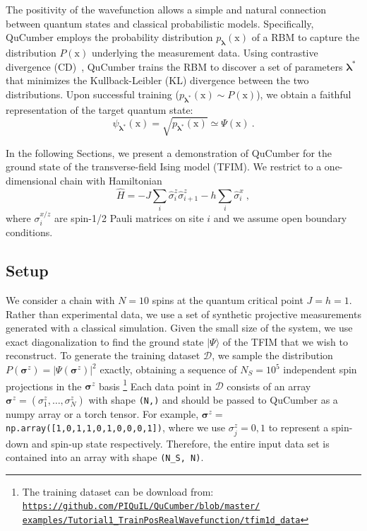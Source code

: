 \documentclass[submission, Phys, hidelinks]{SciPost}
\begin{document}
The positivity of the wavefunction allows a simple and natural connection between quantum states and classical probabilistic models. Specifically, QuCumber employs the probability distribution $p_{\bm{\lambda}}(\bm{\mathrm{x}})$ of a RBM to capture the distribution $P(\bm{\mathrm{x}})$ underlying the measurement data. Using contrastive divergence (CD)~\cite{hinton2002training}, QuCumber trains the RBM to discover a set of parameters $\bm{\lambda}^*$ that minimizes the Kullback-Leibler (KL) divergence between the two distributions. Upon successful training ($p_{\bm{\lambda}^*}(\bm{\mathrm{x}})\sim P(\bm{\mathrm{x}})$), we obtain a faithful representation of the target quantum state:
\begin{equation}\label{wfpd}
    \psi_{\bm{\lambda}^*}(\bm{\mathrm{x}})= \sqrt{p_{\bm{\lambda}^*}(\bm{\mathrm{x}})}
    \simeq\Psi(\bm{\mathrm{x}})\:.
\end{equation} 

In the following Sections, we present a demonstration of QuCumber for the ground state of the transverse-field Ising model (TFIM). We restrict to a one-dimensional chain with Hamiltonian
\begin{equation}
    \hat{H} = -J\sum_i \hat{\sigma}^z_i \hat{\sigma}^z_{i+1} - h \sum_i\hat{\sigma}^x_i\:, \label{TFIM}
\end{equation}
where $\sigma^{x/z}_i$ are spin-1/2 Pauli matrices on site $i$ and we assume open boundary conditions.

\subsection{Setup}\label{subsec:example}
We consider a chain with $N=10$ spins at the quantum critical point $J=h=1$. Rather than experimental data, we use a set of synthetic projective measurements generated with a classical simulation. Given the small size of the system, we use exact diagonalization to find the ground state $|\Psi\rangle$ of the TFIM that we wish to reconstruct. To generate the training dataset $\mathcal{D}$, we sample the distribution $P(\bm{\sigma}^z)=|\Psi(\bm{\sigma}^z)|^2$ exactly, obtaining a sequence of $N_S=10^5$ independent spin projections in the $\bm{\sigma}^z$ basis
\footnote{The training dataset can be download from: 
    \href{https://github.com/PIQuIL/QuCumber/blob/master/examples/Tutorial1_TrainPosRealWavefunction/tfim1d_data.txt}{\texttt{https://github.com/PIQuIL/QuCumber/blob/master/\\examples/Tutorial1\_TrainPosRealWavefunction/tfim1d\_data}}
}
Each data point in $\mathcal{D}$ consists of an array $\bm{\sigma}^z=(\sigma^z_1,\dots,\sigma^z_N)$ with shape \verb|(N,)| and should be passed to QuCumber as a numpy array or a torch tensor. For example, $\bm{\sigma}^z=$ \verb|np.array([1,0,1,1,0,1,0,0,0,1])|, where we use $\sigma_j^z=0,1$ to represent a spin-down and spin-up state respectively. Therefore, the entire input data set is contained into an array with shape \verb|(N_S, N)|.
\end{document}
